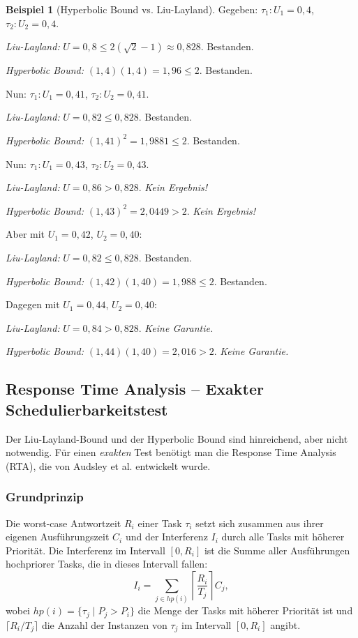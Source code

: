 ﻿\documentclass[a4paper,12pt]{report}
\theoremstyle{definition}
\newtheorem{beispiel}{Beispiel}[chapter]
\begin{document}
\begin{beispiel}[Hyperbolic Bound vs. Liu-Layland]
	Gegeben: $\tau_1: U_1 = 0{,}4$, $\tau_2: U_2 = 0{,}4$.

	\textit{Liu-Layland:} $U = 0{,}8 \leq 2(\sqrt{2}-1) \approx 0{,}828$. Bestanden.

	\textit{Hyperbolic Bound:} $(1{,}4)(1{,}4) = 1{,}96 \leq 2$. Bestanden.

	Nun: $\tau_1: U_1 = 0{,}41$, $\tau_2: U_2 = 0{,}41$.

	\textit{Liu-Layland:} $U = 0{,}82 \leq 0{,}828$. Bestanden.

	\textit{Hyperbolic Bound:} $(1{,}41)^2 = 1{,}9881 \leq 2$. Bestanden.

	Nun: $\tau_1: U_1 = 0{,}43$, $\tau_2: U_2 = 0{,}43$.

	\textit{Liu-Layland:} $U = 0{,}86 > 0{,}828$. \emph{Kein Ergebnis!}

	\textit{Hyperbolic Bound:} $(1{,}43)^2 = 2{,}0449 > 2$. \emph{Kein Ergebnis!}

	Aber mit $U_1 = 0{,}42$, $U_2 = 0{,}40$:

	\textit{Liu-Layland:} $U = 0{,}82 \leq 0{,}828$. Bestanden.

	\textit{Hyperbolic Bound:} $(1{,}42)(1{,}40) = 1{,}988 \leq 2$. Bestanden.

	Dagegen mit $U_1 = 0{,}44$, $U_2 = 0{,}40$:

	\textit{Liu-Layland:} $U = 0{,}84 > 0{,}828$. \emph{Keine Garantie.}

	\textit{Hyperbolic Bound:} $(1{,}44)(1{,}40) = 2{,}016 > 2$. \emph{Keine Garantie.}
\end{beispiel}

\subsection{Response Time Analysis -- Exakter Schedulierbarkeitstest}
\label{sec:rta}

Der Liu-Layland-Bound und der Hyperbolic Bound sind hinreichend, aber nicht
notwendig. Für einen \emph{exakten} Test benötigt man die Response Time Analysis
(RTA), die von Audsley et al. \cite{Audsley1993} entwickelt wurde.

\subsubsection{Grundprinzip}

Die worst-case Antwortzeit $R_i$ einer Task $\tau_i$ setzt sich zusammen aus ihrer
eigenen Ausführungszeit $C_i$ und der Interferenz $I_i$ durch alle Tasks mit höherer
Priorität. Die Interferenz im Intervall $[0, R_i]$ ist die Summe aller Ausführungen
hochpriorer Tasks, die in dieses Intervall fallen:
\[
	I_i = \sum_{j \in hp(i)} \left\lceil \frac{R_i}{T_j} \right\rceil C_j,
\]
wobei $hp(i) = \{\tau_j \mid P_j > P_i\}$ die Menge der Tasks mit höherer Priorität
ist und $\lceil R_i/T_j \rceil$ die Anzahl der Instanzen von $\tau_j$ im Intervall
$[0, R_i]$ angibt.
\end{document}
